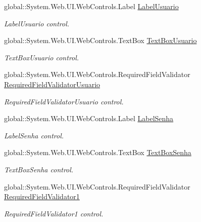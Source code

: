 \begin{DoxyCompactItemize}
global::System.Web.UI.WebControls.Label \hyperlink{class_sistema_r_h_1_1_login_a7b1d7ad62ac3f9378d259aaaf4d0f123}{LabelUsuario}
\begin{DoxyCompactList}\small\item\em LabelUsuario control. \item\end{DoxyCompactList}\item 
global::System.Web.UI.WebControls.TextBox \hyperlink{class_sistema_r_h_1_1_login_a7689b3371502c69760e345cf3b03841b}{TextBoxUsuario}
\begin{DoxyCompactList}\small\item\em TextBoxUsuario control. \item\end{DoxyCompactList}\item 
global::System.Web.UI.WebControls.RequiredFieldValidator \hyperlink{class_sistema_r_h_1_1_login_ab9d57c98d63d3835f67a8224e96bbc46}{RequiredFieldValidatorUsuario}
\begin{DoxyCompactList}\small\item\em RequiredFieldValidatorUsuario control. \item\end{DoxyCompactList}\item 
global::System.Web.UI.WebControls.Label \hyperlink{class_sistema_r_h_1_1_login_a1f74f1a9d8ce23c339e8049f61fbd6bf}{LabelSenha}
\begin{DoxyCompactList}\small\item\em LabelSenha control. \item\end{DoxyCompactList}\item 
global::System.Web.UI.WebControls.TextBox \hyperlink{class_sistema_r_h_1_1_login_a0d19fb767cfff8be37b6f9075b3016da}{TextBoxSenha}
\begin{DoxyCompactList}\small\item\em TextBoxSenha control. \item\end{DoxyCompactList}\item 
global::System.Web.UI.WebControls.RequiredFieldValidator \hyperlink{class_sistema_r_h_1_1_login_a8714ab168feb1904d6fb2461bf744b46}{RequiredFieldValidator1}
\begin{DoxyCompactList}\small\item\em RequiredFieldValidator1 control. \item\end{DoxyCompactList}\item 

\end{DoxyCompactItemize}
